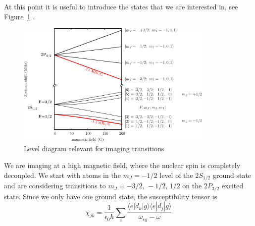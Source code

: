 \documentclass{article}[12pt]
\begin{document}
At this point it is useful to introduce the states that we are interested in, see Figure~\ref{fig:levels} .
\begin{figure}[h]
\centering \includegraphics[width=0.85\textwidth]{01eps.pdf}
\caption[Levels relevant for imaging.]{Level diagram relevant for imaging transitions}  \label{fig:levels}
\end{figure}
We are imaging at a high magnetic field, where the nuclear spin is completely decoupled.   We start with atoms in the $m_{J} = -1/2$ level of the 2$S_{1/2}$ ground state and are considering transitions to $m_{J} = -3/2,\,-1/2,\,1/2$ on the 2$P_{3/2}$ excited state.   Since we only have one ground state, the susceptibility tensor is 
\[ \chi_{jk} = \frac{1}{\epsilon_{0}\hbar } \sum_{e}   \frac{ \langle e | d_{k} | g \rangle   \langle e | d_{j} | g \rangle}{\omega_{eg} -\omega   } \]
\end{document}
